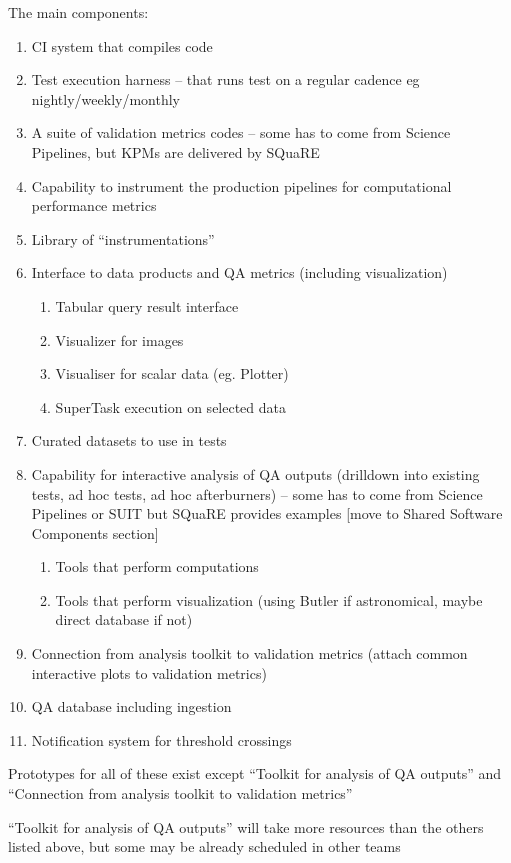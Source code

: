 The main components:
\begin{enumerate}
\item CI system that compiles code
\item Test execution harness – that runs test on a regular cadence eg nightly/weekly/monthly
\item A suite of validation metrics codes – some has to come from Science Pipelines, but KPMs are delivered by SQuaRE
\item Capability to instrument the production pipelines for computational performance metrics
\item Library of “instrumentations”
\item Interface to data products and QA metrics (including visualization)
    \begin{enumerate}
    \item Tabular query result interface
    \item Visualizer for images
    \item Visualiser for scalar data (eg. Plotter)
    \item SuperTask execution on selected data
    \end{enumerate}
\item Curated datasets to use in tests
\item Capability for interactive analysis of QA outputs (drilldown into existing tests, ad hoc tests, ad hoc afterburners) – some has to come from Science Pipelines or SUIT but SQuaRE provides examples [move to Shared Software Components section]
    \begin{enumerate}
    \item Tools that perform computations
    \item Tools that perform visualization (using Butler if astronomical, maybe direct database if not)
    \end{enumerate}
\item Connection from analysis toolkit to validation metrics (attach common interactive plots to validation metrics)
\item QA database including ingestion
\item Notification system for threshold crossings
\end{enumerate}

Prototypes for all of these exist except ``Toolkit for analysis of QA outputs'' and ``Connection from analysis toolkit to validation metrics''

``Toolkit for analysis of QA outputs'' will take more resources than the others listed above, but some may be already scheduled in other teams

